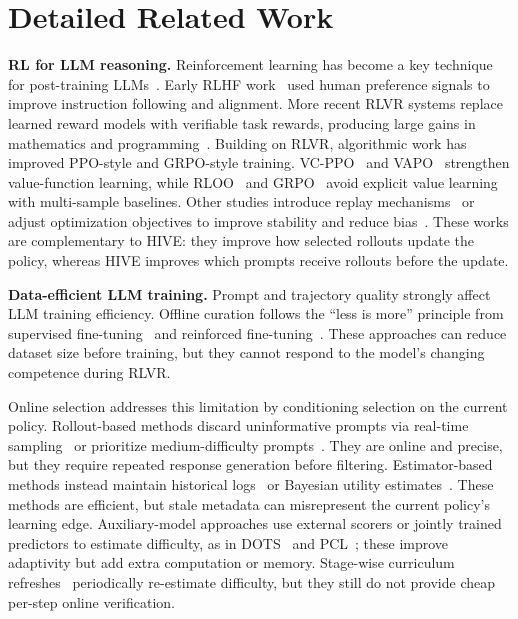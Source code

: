 \section{Detailed Related Work}
\label{appendix-sec:detailed_related_work}
\textbf{RL for LLM reasoning.}
Reinforcement learning has become a key technique for post-training LLMs~\cite{christiano2017deep,bai2022training}. Early RLHF work~\cite{ouyang2022training,rafailov2023direct} used human preference signals to improve instruction following and alignment. More recent RLVR systems replace learned reward models with verifiable task rewards, producing large gains in mathematics and programming~\cite{guo2025deepseek,hu2025reinforce++,liu2503understanding,jaech2024openai,Zhang2025SRPOAC}. Building on RLVR, algorithmic work has improved PPO-style and GRPO-style training. VC-PPO~\cite{yuan2025s} and VAPO~\cite{yue2025vapo} strengthen value-function learning, while RLOO~\cite{ahmadian2024back} and GRPO~\cite{shao2024deepseekmath} avoid explicit value learning with multi-sample baselines. Other studies introduce replay mechanisms~\cite{liang2025squeeze,li2025repo,zhang2025rlep,lu2025safe} or adjust optimization objectives to improve stability and reduce bias~\cite{liu2503understanding,chu2025gpg,huang2025mapo,zheng2025group,www2025TFDCon,yyt2024eccv}. These works are complementary to HIVE: they improve how selected rollouts update the policy, whereas HIVE improves which prompts receive rollouts before the update.

\textbf{Data-efficient LLM training.}
Prompt and trajectory quality strongly affect LLM training efficiency. Offline curation follows the ``less is more'' principle from supervised fine-tuning~\cite{zhou2023lima,ye2025limo,zheng2024picture,wang2025comprehensivesurveyllmagentstack,tkde2024DConRec} and reinforced fine-tuning~\cite{Wang2025ReinforcementLF,Fatemi2025ConciseRV,Li2025LIMRLI,shi2025efficient,tang2025towards,cikm2022DcRec}. These approaches can reduce dataset size before training, but they cannot respond to the model's changing competence during RLVR.

Online selection addresses this limitation by conditioning selection on the current policy. Rollout-based methods discard uninformative prompts via real-time sampling~\cite{yu2025dapo,meng2025mm,foster2025learning,xu2025not,lin2025cppo,sun2025efficient} or prioritize medium-difficulty prompts~\cite{bae2025online}. They are online and precise, but they require repeated response generation before filtering. Estimator-based methods instead maintain historical logs~\cite{zheng2025act} or Bayesian utility estimates~\cite{chen2025self,zeng2025cures,shen2025bots}. These methods are efficient, but stale metadata can misrepresent the current policy's learning edge. Auxiliary-model approaches use external scorers or jointly trained predictors to estimate difficulty, as in DOTS~\cite{sun2025dots} and PCL~\cite{Gao2025PCL}; these improve adaptivity but add extra computation or memory. Stage-wise curriculum refreshes~\cite{zhang2025learning,Zhang2025SRPOAC} periodically re-estimate difficulty, but they still do not provide cheap per-step online verification.

